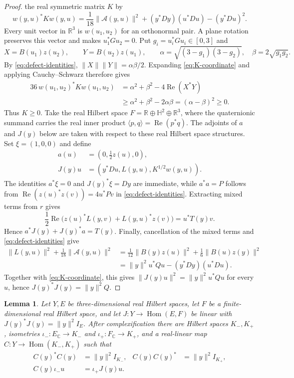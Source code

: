 \documentclass[11pt,onecolumn]{article}
\theoremstyle{blueplain}
\newtheorem{lemma}[lemma]{Lemma}
\theoremstyle{bluedefinition}
\theoremstyle{bluedefinition}
\begin{document}
\begin{proof}
the real symmetric matrix $K$ by
\begin{equation}\label{eq:K-coordinate}
 w(y,u)^*Kw(y,u)=\frac1{18}\|\mathcal A(y,u)\|^2
 +(y^*Dy)(u^*Du)-(y^*Du)^2.
\end{equation}
Every unit vector in $\mathbb R^3$ is $w(u_1,u_2)$ for an orthonormal
pair.  A plane rotation preserves this vector and makes $u_1^*Gu_2=0$.
Put $g_i=u_i^*Gu_i\in[0,3]$ and
\[
 X=B(u_1)z(u_2),\qquad Y=B(u_2)z(u_1),\qquad
 \alpha=\sqrt{(3-g_1)(3-g_2)},\quad \beta=2\sqrt{g_1g_2}.
\]
By \eqref{eq:defect-identities},
$\|X\|\|Y\|=\alpha\beta/2$.  Expanding
\eqref{eq:K-coordinate} and applying Cauchy--Schwarz therefore gives
\[
 \begin{aligned}
 36\,w(u_1,u_2)^*Kw(u_1,u_2)
 &=\alpha^2+\beta^2-4\operatorname{Re}(X^*Y)\\
 &\geqslant\alpha^2+\beta^2-2\alpha\beta
 =(\alpha-\beta)^2\geqslant0.
 \end{aligned}
\]
Thus $K\geqslant0$.  Take the real Hilbert space
$F=\mathbb R\oplus\mathbb H^2\oplus\mathbb R^3$, where the quaternionic
summand carries the real inner product
$\langle p,q\rangle=\operatorname{Re}(p^*q)$.
The adjoints of $a$ and $J(y)$ below are taken with respect to these real
Hilbert space structures.  Set $\xi=(1,0,0)$ and define
\[
 \begin{aligned}
 a(u)&=(0,\tfrac12z(u),0),\\
 J(y)u&=(y^*Du,L(y,u),K^{1/2}w(y,u)).
 \end{aligned}
\]
The identities $a^*\xi=0$ and $J(y)^*\xi=Dy$ are immediate, while
$a^*a=P$ follows from
$\operatorname{Re}(z(u)^*z(v))=4u^*Pv$ in \eqref{eq:defect-identities}.
Extracting mixed terms from $r$ gives
\[
 \frac12\operatorname{Re}\bigl(z(u)^*L(y,v)
 +L(y,u)^*z(v)\bigr)
 =u^*T(y)v.
\]
Hence $a^*J(y)+J(y)^*a=T(y)$.  Finally, cancellation of the mixed terms
and \eqref{eq:defect-identities} give
\[
 \begin{aligned}
 \|L(y,u)\|^2+\frac1{18}\|\mathcal A(y,u)\|^2
 &=\frac1{12}\|B(y)z(u)\|^2+\frac16\|B(u)z(y)\|^2\\
 &=\|y\|^2u^*Qu-(y^*Dy)(u^*Du).
 \end{aligned}
\]
Together with \eqref{eq:K-coordinate}, this gives
$\|J(y)u\|^2=\|y\|^2u^*Qu$ for every $u$, hence
$J(y)^*J(y)=\|y\|^2Q$.
\end{proof}

\begin{lemma}\label{lem:three-generator}
Let $Y,E$ be three-dimensional real Hilbert spaces, let $F$ be a
finite-dimensional real Hilbert space, and let
$J\colon Y\to\operatorname{Hom}(E,F)$ be linear with
$J(y)^*J(y)=\|y\|^2I_E$.  After complexification there are Hilbert spaces
$K_-,K_+$, isometries $\iota_-\colon E_{\mathbb C}\to K_-$ and
$\iota_+\colon F_{\mathbb C}\to K_+$, and a real-linear map
$C\colon Y\to\operatorname{Hom}(K_-,K_+)$ such that
\[
 \begin{aligned}
 C(y)^*C(y)&=\|y\|^2I_{K_-},&
 C(y)C(y)^*&=\|y\|^2I_{K_+},\\
 C(y)\iota_-u&=\iota_+J(y)u.
 \end{aligned}
\]
\end{lemma}
\end{document}
